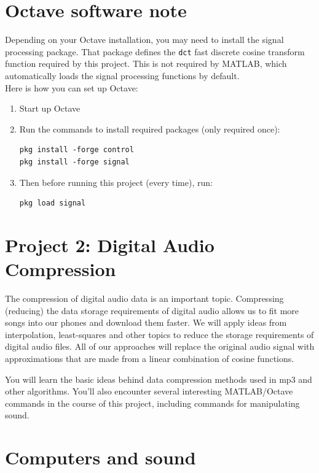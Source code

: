 \documentclass[10pt]{article}
\begin{document}
\section*{Octave software note} Depending on your Octave installation, you may
need to install the signal processing package. That package defines the
\verb+dct+ fast discrete cosine transform function required by this project.
This is not required by MATLAB, which automatically loads the signal processing
functions by default.\\

Here is how you can set up Octave:

\begin{enumerate}
\item Start up Octave
\item Run the commands to install required packages (only required once):
\begin{verbatim}
pkg install -forge control
pkg install -forge signal
\end{verbatim}
\item Then before running this project (every time), run:
\begin{verbatim}
pkg load signal
\end{verbatim}
\end{enumerate}


\section*{Project 2: Digital Audio Compression}

The compression of digital audio data is an important topic.  Compressing
(reducing) the data storage requirements of digital audio allows us to fit more
songs into our phones and download them faster. We will apply ideas from
interpolation, least-squares and other topics to reduce the storage
requirements of digital audio files. All of our approaches will replace the
original audio signal with approximations that are made from a linear
combination of cosine functions.

You will learn the basic ideas behind data compression methods used in mp3 and
other algorithms. You'll also encounter several interesting MATLAB/Octave
commands in the course of this project, including commands for manipulating
sound.

\section*{Computers and sound}
\end{document}
